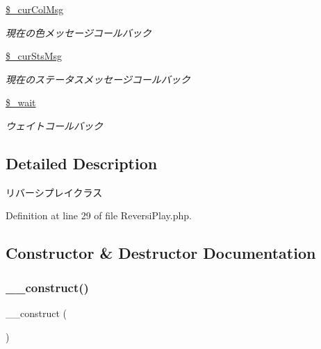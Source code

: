 \begin{DoxyCompactItemize}
\mbox{\label{class_reversi_play_a6e19a53e6b12fbb372d789245c422ead}} 
\hyperlink{class_reversi_play_a6e19a53e6b12fbb372d789245c422ead}{\$\+\_\+cur\+Col\+Msg}
\begin{DoxyCompactList}\small\item\em 現在の色メッセージコールバック \end{DoxyCompactList}\item 
\mbox{\label{class_reversi_play_a213bf1223175cab6cd4794b7bff46e01}} 
\hyperlink{class_reversi_play_a213bf1223175cab6cd4794b7bff46e01}{\$\+\_\+cur\+Sts\+Msg}
\begin{DoxyCompactList}\small\item\em 現在のステータスメッセージコールバック \end{DoxyCompactList}\item 
\mbox{\label{class_reversi_play_aab934641dc936291a9c3c395eb6aa694}} 
\hyperlink{class_reversi_play_aab934641dc936291a9c3c395eb6aa694}{\$\+\_\+wait}
\begin{DoxyCompactList}\small\item\em ウェイトコールバック \end{DoxyCompactList}\end{DoxyCompactItemize}


\subsection{Detailed Description}
リバーシプレイクラス 

Definition at line 29 of file Reversi\+Play.\+php.



\subsection{Constructor \& Destructor Documentation}
\mbox{\label{class_reversi_play_a095c5d389db211932136b53f25f39685}} 
\subsubsection{\texorpdfstring{\+\_\+\+\_\+construct()}{\_\_construct()}}
{\footnotesize\ttfamily \+\_\+\+\_\+construct (\begin{DoxyParamCaption}{ }\end{DoxyParamCaption})}



